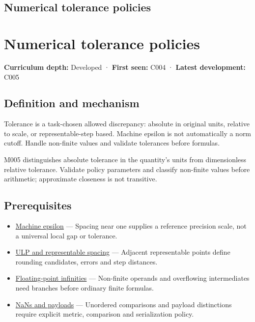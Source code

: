 \hypertarget{appendix-0ec599f8ba27}{}
\section*{Numerical tolerance policies}
\chapter{Numerical tolerance policies}\label{appendix-0ec599f8ba27-numerical-tolerance-policies}

\textbf{Curriculum depth:} Developed · \textbf{First seen:} C004 · \textbf{Latest development:} C005

\section{Definition and mechanism}\label{appendix-0ec599f8ba27-definition-and-mechanism}

Tolerance is a task-chosen allowed discrepancy: absolute in original units, relative to scale, or representable-step based. Machine epsilon is not automatically a norm cutoff. Handle non-finite values and validate tolerances before formulas.

M005 distinguishes absolute tolerance in the quantity's units from dimensionless relative tolerance. Validate policy parameters and classify non-finite values before arithmetic; approximate closeness is not transitive.

\section{Prerequisites}\label{appendix-0ec599f8ba27-prerequisites}

\begin{itemize}
\tightlist
\item
  \hyperref[appendix-390ea641da54]{Machine epsilon} --- Spacing near one supplies a reference precision scale, not a universal local gap or tolerance.
\item
  \hyperref[appendix-14bab4cab9d4]{ULP and representable spacing} --- Adjacent representable points define rounding candidates, errors and step distances.
\item
  \hyperref[appendix-eb336149c00a]{Floating-point infinities} --- Non-finite operands and overflowing intermediates need branches before ordinary finite formulas.
\item
  \hyperref[appendix-d6607cc4c235]{NaNs and payloads} --- Unordered comparisons and payload distinctions require explicit metric, comparison and serialization policy.
\end{itemize}

